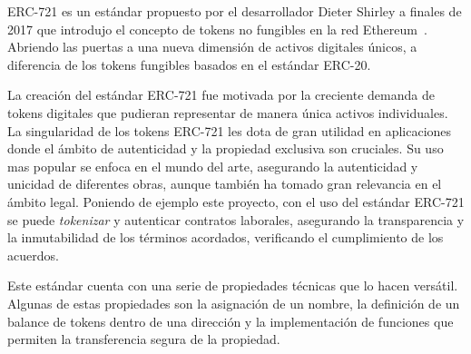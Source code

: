 ERC-721 es un estándar propuesto por el desarrollador Dieter Shirley a finales de 2017 que introdujo el concepto de tokens no fungibles en la red Ethereum~\cite{ERC721Introducción}.
Abriendo las puertas a una nueva dimensión de activos digitales únicos, a diferencia de los tokens fungibles basados en el estándar ERC-20.

La creación del estándar ERC-721 fue motivada por la creciente demanda de tokens digitales que pudieran representar de manera única activos individuales.
La singularidad de los tokens ERC-721 les dota de gran utilidad en aplicaciones donde el ámbito de autenticidad y la propiedad exclusiva son cruciales.
Su uso mas popular se enfoca en el mundo del arte, asegurando la autenticidad y unicidad de diferentes obras, aunque también ha tomado gran relevancia en el ámbito legal. 
Poniendo de ejemplo este proyecto, con el uso del estándar ERC-721 se puede \textit{tokenizar} y autenticar contratos laborales, asegurando la transparencia y la inmutabilidad de los términos acordados, verificando el cumplimiento de los acuerdos.

Este estándar cuenta con una serie de propiedades técnicas que lo hacen versátil. Algunas de estas propiedades son la asignación de un nombre, la definición de un balance de tokens dentro de una dirección y la implementación de funciones que permiten la transferencia segura de la propiedad.

